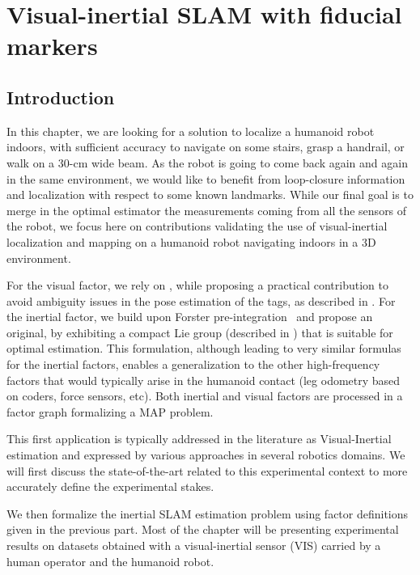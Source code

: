 \chapter{Visual-inertial SLAM with fiducial markers}
\label{chp:absolute_vi}
\minitoc
\bigskip



\section{Introduction}

In this chapter, we are looking for a solution to localize a humanoid robot indoors, with sufficient accuracy to navigate on some stairs, grasp a handrail, or 
walk on a 30-cm wide beam. 
As the robot is going to come back again and again in the same environment, we would like to benefit from loop-closure information and localization with 
respect to some known landmarks. 
While our final goal is to merge in the optimal estimator the measurements coming from all the sensors of the robot, we focus here on contributions 
validating the use of visual-inertial localization and mapping on a humanoid robot navigating indoors in a 3D environment.

For the visual factor, we rely on \apriltags \cite{wang2016iros}, while proposing a practical contribution to avoid ambiguity 
issues in the pose estimation of the tags, as described in . 
For the inertial factor, we build upon Forster pre-integration~\cite{forster2017-TRO} and propose an original, 
by exhibiting a compact Lie group (described in ) that is suitable for optimal estimation. 
This formulation, although leading to very similar formulas for the inertial factors, enables a generalization to the other high-frequency factors 
that would typically arise in the humanoid contact (leg odometry based on coders, force sensors, etc).
Both inertial and visual factors are processed in a factor graph formalizing a MAP problem.

This first application is typically addressed in the literature as Visual-Inertial estimation and expressed by various approaches in several robotics domains.
We will first discuss the state-of-the-art related to this experimental context to more accurately define the experimental stakes.

We then formalize the inertial SLAM estimation problem using factor definitions given in the previous part. 
Most of the chapter will be presenting experimental results on datasets obtained
with a visual-inertial sensor (VIS) carried by a human operator and the  humanoid robot. 


